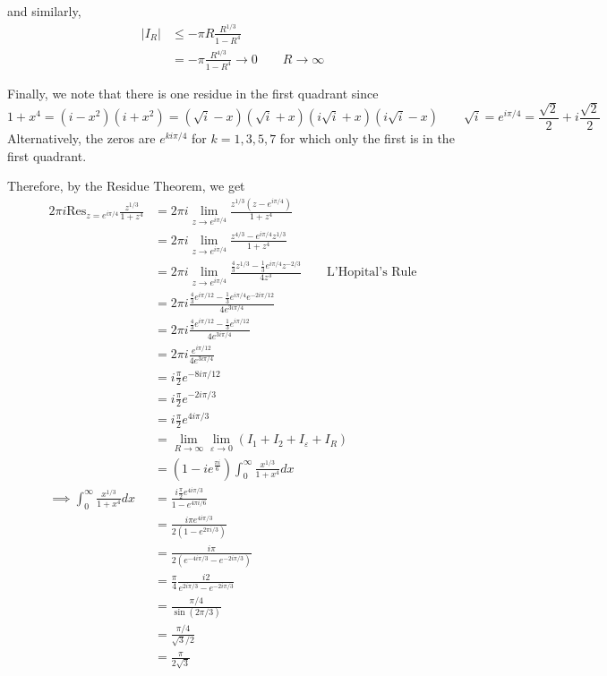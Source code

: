 \documentclass[12pt]{Homework}
\newcommand{\res}{\text{Res}}
\begin{document}
\begin{solution}
and similarly, \begin{align*}
    |I_R|&\le-\pi R\frac{R^{1/3}}{1-R^4}\\
    &=-\pi\frac{R^{4/3}}{1-R^4}\to0\qquad R\to\infty
\end{align*}

Finally, we note that there is one residue in the first quadrant since $$1+x^4=(i-x^2)(i+x^2)=(\sqrt{i}-x)(\sqrt{i}+x)(i\sqrt{i}+x)(i\sqrt{i}-x)\qquad\sqrt{i}=e^{i\pi/4}=\frac{\sqrt{2}}{2}+i\frac{\sqrt{2}}{2}$$ Alternatively, the zeros are $e^{ki\pi/4}$ for $k=1,3,5,7$ for which only the first is in the first quadrant.

Therefore, by the Residue Theorem, we get \begin{align*}
    2\pi i\res_{z=e^{i\pi/4}}\frac{z^{1/3}}{1+z^4}&=2\pi i\lim_{z\to e^{i\pi/4}}\frac{z^{1/3}(z-e^{i\pi/4})}{1+z^4}\\
    &=2\pi i\lim_{z\to e^{i\pi/4}}\frac{z^{4/3}-e^{i\pi/4}z^{1/3}}{1+z^4}\\
    &=2\pi i\lim_{z\to e^{i\pi/4}}\frac{\frac{4}{3}z^{1/3}-\frac{1}{3}e^{i\pi/4}z^{-2/3}}{4z^3}\qquad\text{L'Hopital's Rule}\\
    &=2\pi i\frac{\frac{4}{3}e^{i\pi/12}-\frac{1}{3}e^{i\pi/4}e^{-2i\pi/12}}{4e^{3i\pi/4}}\\
    &=2\pi i\frac{\frac{4}{3}e^{i\pi/12}-\frac{1}{3}e^{i\pi/12}}{4e^{3i\pi/4}}\\
    &=2\pi i\frac{e^{i\pi/12}}{4e^{3i\pi/4}}\\
    &=i\frac{\pi}{2}e^{-8i\pi /12}\\
    &=i\frac{\pi}{2}e^{-2i\pi /3}\\
    &=i\frac{\pi}{2}e^{4i\pi /3}\\
    &=\lim_{R\to\infty}\lim_{\varepsilon\to0}(I_1+I_2+I_\varepsilon+I_R)\\
    &=(1-ie^{\frac{\pi i}{6}})\int_0^\infty\frac{x^{1/3}}{1+x^4}dx\\
    \implies \int_0^\infty\frac{x^{1/3}}{1+x^4}dx&=\frac{i\frac{\pi}{2}e^{4i\pi /3}}{1-e^{4\pi i/6}}\\
    &=\frac{i\pi e^{4i\pi /3}}{2(1-e^{2\pi i/3})}\\
    &=\frac{i\pi}{2(e^{-4i\pi/3}-e^{-2i\pi/3})}\\
    &=\frac{\pi}{4}\frac{i2}{e^{2i\pi/3}-e^{-2i\pi/3}}\\
    &=\frac{\pi/4}{\sin(2\pi/3)}\\
    &=\frac{\pi/4}{\sqrt{3}/2}\\
    &=\frac{\pi}{2\sqrt{3}}
\end{align*}

\end{solution}
\newpage
\end{document}
